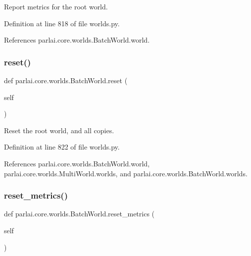 \begin{DoxyVerb}Report metrics for the root world.\end{DoxyVerb}
 

Definition at line 818 of file worlds.\+py.



References parlai.\+core.\+worlds.\+Batch\+World.\+world.

\mbox{\label{classparlai_1_1core_1_1worlds_1_1BatchWorld_a00ba541479129163a13a0377797504e1}} 
\subsubsection{\texorpdfstring{reset()}{reset()}}
{\footnotesize\ttfamily def parlai.\+core.\+worlds.\+Batch\+World.\+reset (\begin{DoxyParamCaption}\item[{}]{self }\end{DoxyParamCaption})}

\begin{DoxyVerb}Reset the root world, and all copies.\end{DoxyVerb}
 

Definition at line 822 of file worlds.\+py.



References parlai.\+core.\+worlds.\+Batch\+World.\+world, parlai.\+core.\+worlds.\+Multi\+World.\+worlds, and parlai.\+core.\+worlds.\+Batch\+World.\+worlds.

\mbox{\label{classparlai_1_1core_1_1worlds_1_1BatchWorld_a16a31209d87f0f9bf27871110bd63aa6}} 
\subsubsection{\texorpdfstring{reset\+\_\+metrics()}{reset\_metrics()}}
{\footnotesize\ttfamily def parlai.\+core.\+worlds.\+Batch\+World.\+reset\+\_\+metrics (\begin{DoxyParamCaption}\item[{}]{self }\end{DoxyParamCaption})}

